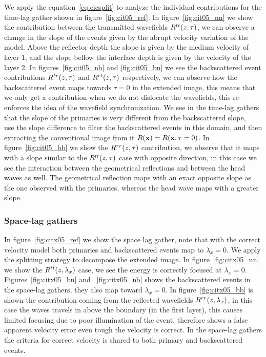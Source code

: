 We apply the equation~\ref{eq:eicsplit} to analyze the individual contributions
for the time-lag gather shown in figure~\ref{fig:cit05_ref}. In figure~\ref{fig:cit05_nn} we show the contribution between
the transmitted wavefields $R^{tt}(z,\tau)$, we can observe a change in the slope of the events given by the abrupt velocity variation of the model. 
Above the reflector depth the slope is given by the medium velocity of layer 1, and the slope bellow the interface depth is given
 by the velocity of the layer 2. In figures~\ref{fig:cit05_nb} and \ref{fig:cit05_bn} we see the backscattered
 event contributions $R^{tr}(z,\tau)$ and $R^{rt}(z,\tau)$ respectively, we can observe how the backscattered event maps towards $\tau=0$
in the extended image, this means that we only get a contribution when we do not dislocate the wavefields, this re-enforces
the idea of the wavefield synchronization. We see in the time-lag gathers that the slope of the primaries is very different
from the backscattered slope, ~\cite{kaelin:3125} use the slope difference to filter the backscattered 
events in this domain, and then extracting the conventional image from it $R({\bf x})=R({\bf x},\tau=0)$. In figure~\ref{fig:cit05_bb} 
we show the $R^{rr}(z,\tau)$ contribution, we observe that it maps with a slope similar to the $R^{tt}(z,\tau)$ case with opposite direction, 
in this case we see the interaction between the geometrical reflections and between the head waves as well. The geometrical reflection
maps with an exact opposite slope as the one observed with the primaries, whereas the head wave maps with a greater slope.

\subsubsection{Space-lag gathers}

In figure~\ref{fig:citx05_ref} we show the space lag gather, note that with the correct velocity model both primaries and
backscattered events map to $\lambda_x=0$. We apply the splitting strategy to decompose the extended image. In figure~\ref{fig:citx05_nn}
we show the $R^{tt}(z,\lambda_x)$ case, we see the energy is correctly focused at $\lambda_x=0$. Figures~\ref{fig:citx05_bn} and ~\ref{fig:citx05_nb}
shows the backscattered events in the space-lag gathers, they also map toward $\lambda_x=0$. In figure~\ref{fig:citx05_bb} is shown
the contribution coming from the reflected wavefields $R^{rr}(z,\lambda_x)$, in this case the waves travels in above the boundary (in the first layer),
this causes limited focusing due to poor illumination of the event, therefore shows a false apparent velocity error even tough the velocity
is correct. In the space-lag gathers the criteria for correct velocity is shared to both primary and backscattered events.

